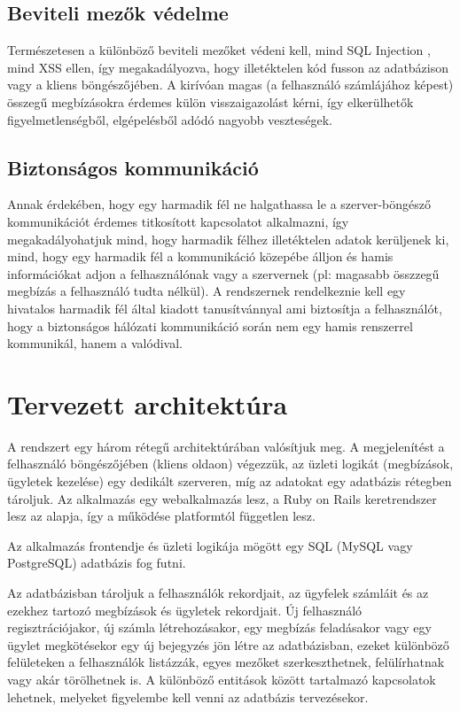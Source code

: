 \subsection{Beviteli mezők védelme}
Természetesen a különböző beviteli mezőket védeni kell, mind SQL Injection , mind XSS ellen, így megakadályozva, hogy illetéktelen kód fusson az adatbázison vagy a kliens böngészőjében.  A kirívóan magas (a felhasználó számlájához képest) összegű megbízásokra érdemes külön visszaigazolást kérni, így elkerülhetők figyelmetlenségből, elgépelésből adódó nagyobb veszteségek.

\subsection{Biztonságos kommunikáció}
Annak érdekében, hogy egy harmadik fél ne halgathassa le a szerver-böngésző kommunikációt érdemes titkosított kapcsolatot alkalmazni, így megakadályohatjuk mind, hogy harmadik félhez illetéktelen adatok kerüljenek ki, mind, hogy egy harmadik fél a kommunikáció közepébe álljon és hamis információkat adjon a felhasználónak vagy a szervernek (pl: magasabb összzegű megbízás a felhasználó tudta nélkül).
A rendszernek rendelkeznie kell egy hivatalos harmadik fél által kiadott tanusítvánnyal ami biztosítja a felhasználót, hogy a biztonságos hálózati kommunikáció során nem egy hamis renszerrel kommunikál, hanem a valódival.

\section{Tervezett architektúra}\label{sect:designed_architecture}

A rendszert egy három rétegű architektúrában valósítjuk meg. A megjelenítést a felhasználó böngészőjében (kliens oldaon) végezzük, az üzleti logikát (megbízások, ügyletek kezelése) egy dedikált szerveren, míg az adatokat egy adatbázis rétegben tároljuk.
Az alkalmazás egy webalkalmazás lesz, a Ruby on Rails keretrendszer lesz az alapja, így a működése platformtól független lesz. 

Az alkalmazás frontendje és üzleti logikája mögött egy SQL (MySQL vagy PostgreSQL) adatbázis fog futni.

Az adatbázisban tároljuk a felhasználók rekordjait, az ügyfelek számláit és az ezekhez tartozó megbízások és ügyletek rekordjait. Új felhasználó regisztrációjakor, új számla létrehozásakor, egy megbízás feladásakor vagy egy ügylet megkötésekor egy új bejegyzés jön létre az adatbázisban, ezeket különböző felületeken a felhasználók listázzák, egyes mezőket szerkeszthetnek, felülírhatnak vagy akár törölhetnek is. A különböző entitások között tartalmazó kapcsolatok lehetnek, melyeket figyelembe kell venni az adatbázis tervezésekor.

